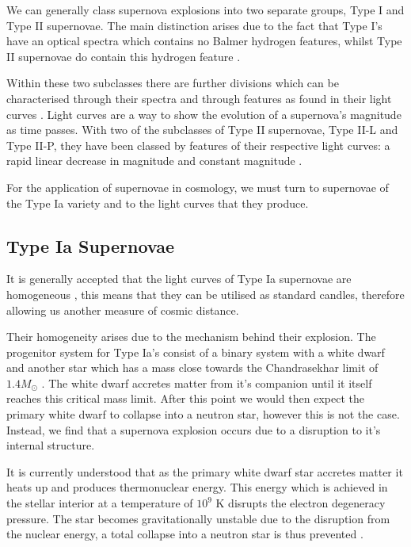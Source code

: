\documentclass[twocolumn]{revtex4}
\begin{document}
We can generally class supernova explosions into two separate groups, Type I and Type II supernovae. The main distinction arises due to the fact that Type I's have an optical spectra which contains no Balmer hydrogen features, whilst Type II supernovae do contain this hydrogen feature \cite{mod_ast}. 

Within these two subclasses there are further divisions which can be characterised through their spectra and through features as found in their light curves \cite{obs_phys_class_sn}. Light curves are a way to show the evolution of a supernova's magnitude as time passes. With two of the subclasses of Type II supernovae, Type II-L and Type II-P, they have been classed by features of their respective light curves: a rapid linear decrease in magnitude and constant magnitude \cite{mod_ast}.

For the application of supernovae in cosmology, we must turn to supernovae of the Type Ia variety and to the light curves that they produce. 

\vspace{-3ex}
\subsection{Type Ia Supernovae}
\vspace{-2ex}
It is generally accepted that the light curves of Type Ia supernovae are homogeneous \cite{posn}, this means that they can be utilised as standard candles, therefore allowing us another measure of cosmic distance. 

Their homogeneity arises due to the mechanism behind their explosion. The progenitor system for Type Ia's consist of a binary system with a white dwarf and another star which has a mass close towards the Chandrasekhar limit of $1.4 M_{\odot}$ \cite{mod_ast, posn}. The white dwarf accretes matter from it's companion until it itself reaches this critical mass limit. After this point we would then expect the primary white dwarf to collapse into a neutron star, however this is not the case. Instead, we find that a supernova explosion occurs due to a disruption to it's internal structure.

It is currently understood that as the primary white dwarf star accretes matter it heats up and produces thermonuclear energy. This energy which is achieved in the stellar interior at a temperature of $10^9$ K disrupts the electron degeneracy pressure. The star becomes gravitationally unstable due to the disruption from the nuclear energy, a total collapse into a neutron star is thus prevented \cite{longair, posn}.
\end{document}
